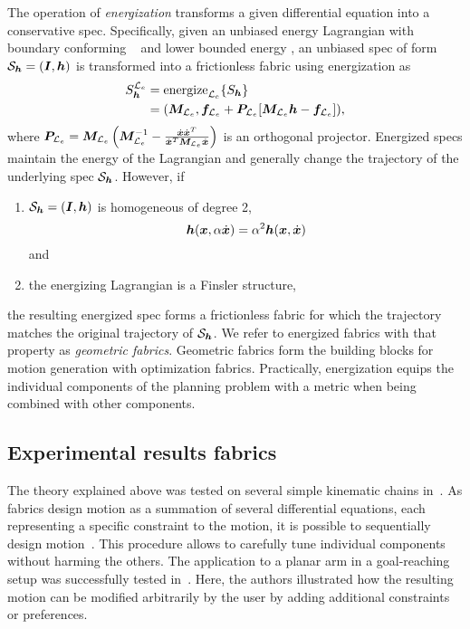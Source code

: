 The operation of \textit{energization} transforms a given differential equation into
a conservative spec.
Specifically, given an unbiased energy Lagrangian \le{} with boundary conforming
\Me{}~\cite[Definition~4.6]{Ratliff2020} and
lower bounded energy \he{}, an unbiased spec of form $\mathcal{S}_{\bm{h}} = (\bm{I},\bm{h})$
is transformed into a frictionless fabric using energization as
\begin{equation}
  \begin{split}
  S_{\bm{h}}^{\mathcal{L}_e} &= \text{energize}_{\mathcal{L}_e}\{S_{\bm{h}}\} \\
    &= (\bm{M}_{\mathcal{L}_e}, \bm{f}_{\mathcal{L}_e} + \bm{P}_{\mathcal{L}_e}[\bm{M}_{\mathcal{L}_e}\bm{h} - \bm{f}_{\mathcal{L}_e}]), 
  \end{split}
\end{equation}
where $\bm{P}_{\mathcal{L}_e} = \bm{M}_{\mathcal{L}_e}\left(\bm{M}_{\mathcal{L}_e}^{-1} - \frac{\dot{\bm{x}}\dot{\bm{x}}^T}{\dot{\bm{x}}^T\bm{M}_{\mathcal{L}_e}\dot{\bm{x}}}\right)$ is an
orthogonal projector.
Energized specs maintain the energy of the Lagrangian and generally change
the trajectory of the underlying spec $\mathcal{S}_{\bm{h}}$.
However, if 
\begin{enumerate}
  \item $\mathcal{S}_{\bm{h}} = (\bm{I},\bm{h})$ is homogeneous of degree 2,
    \begin{equation}\bm{h}(\bm{x}, \alpha\dot{\bm{x}}) = \alpha^2\bm{h}(\bm{x}, \dot{\bm{x}})\label{eq:homogeneous}\end{equation}
    and
  \item the energizing Lagrangian is a Finsler structure, 
\end{enumerate}
the resulting energized spec forms a frictionless fabric for which the trajectory matches
the original trajectory of $\mathcal{S}_{\bm{h}}$. We refer to energized fabrics with that
property as \textit{geometric fabrics}. Geometric fabrics form the building blocks for
motion generation with optimization fabrics.
Practically, energization equips the individual components of the planning problem
with a metric when being combined with other components.


\subsection{Experimental results fabrics}%
\label{sub:experimental_results_fabrics}

The theory explained above was tested on several simple kinematic chains
in~\cite{Ratliff2020,Ratliff2021}. As fabrics design motion as a summation of several
differential equations, each representing a specific constraint to the motion, it is
possible to sequentially design motion~\cite{Ratliff2020}. This procedure allows to
carefully tune individual components without harming the others. The application to a
planar arm in a goal-reaching setup was successfully tested in~\cite{Ratliff2020}. Here,
the authors illustrated how the resulting motion can be modified arbitrarily by the user
by adding additional constraints or preferences.

